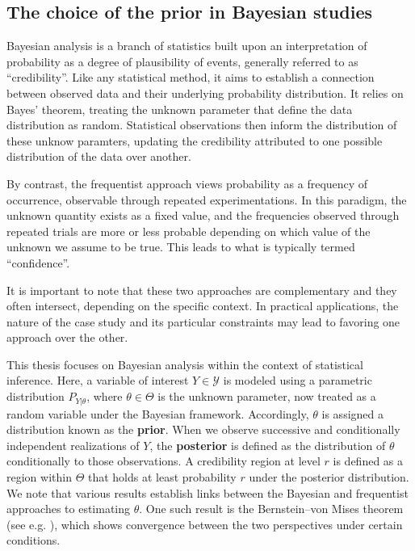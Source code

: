 \subsection{The choice of the prior in Bayesian studies}

Bayesian analysis is a branch of statistics built upon an interpretation of probability as a degree of plausibility of events, generally referred to as ``credibility''. Like any statistical method, it aims to establish a connection between observed data and their underlying probability distribution. It relies on Bayes’ theorem, treating the unknown parameter that define the data distribution as random. Statistical observations then inform the distribution of these unknow paramters, updating the credibility attributed to one possible distribution of the data over another.

By contrast, the frequentist approach views probability as a 
frequency of occurrence, observable through repeated experimentations. In this paradigm, the unknown quantity exists as a fixed value, and the frequencies observed through repeated trials are more or less probable depending on which value of the unknown we assume to be true. This leads to what is typically termed ``confidence''.

It is important to note that these two approaches are complementary %
and they often intersect, depending on the specific context. In practical applications, the nature of the case study and its particular constraints may lead to favoring one approach over the other.

This thesis focuses on Bayesian analysis within the context of statistical inference. Here, a variable of interest $Y \in \mathcal{Y}$ is modeled using a parametric distribution $P_{Y|\theta}$, where $\theta \in \Theta$ is the unknown parameter, now treated as a random variable under the Bayesian framework. Accordingly, $\theta$ is assigned a distribution known as the \textbf{prior}. When we observe successive and conditionally independent realizations of $Y$, the \textbf{posterior} is defined as the distribution of $\theta$ conditionally to those observations.
A credibility region at level $r$ is defined as a region within $\Theta$ that holds at least probability $r$ under the posterior distribution. We note that various results establish links between the Bayesian and frequentist approaches to estimating $\theta$. One such result is the Bernstein–von Mises theorem (see e.g. \cite{van_der_vaart_asymptotic_1992}), which shows convergence between the two perspectives under certain conditions.

